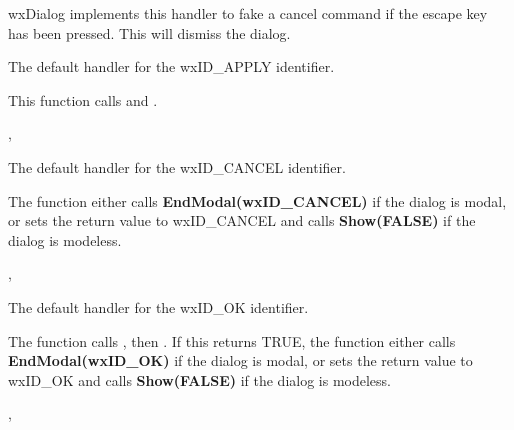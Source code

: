 
wxDialog implements this handler to fake a cancel command if the escape key has been
pressed. This will dismiss the dialog.

\label{wxdialogonapply}


The default handler for the wxID\_APPLY identifier.


This function calls  and .


, 

\label{wxdialogoncancel}


The default handler for the wxID\_CANCEL identifier.


The function either calls {\bf EndModal(wxID\_CANCEL)} if the dialog is modal, or
sets the return value to wxID\_CANCEL and calls {\bf Show(FALSE)} if the dialog is modeless.


, 

\label{wxdialogonok}


The default handler for the wxID\_OK identifier.


The function calls
\rtfsp{}, then .
If this returns TRUE, the function either calls {\bf EndModal(wxID\_OK)} if the dialog is modal, or
sets the return value to wxID\_OK and calls {\bf Show(FALSE)} if the dialog is modeless.


, 

